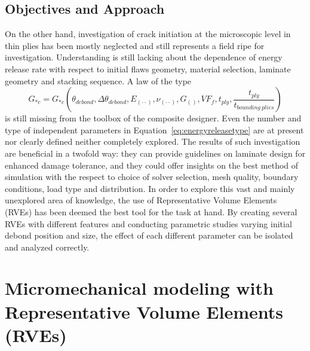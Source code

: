 \documentclass[a4paper]{jpconf}
\begin{document}
\subsection{Objectives and Approach}
On the other hand, investigation of crack initiation at the microscopic level in thin plies has been mostly neglected and still represents a field ripe for investigation. Understanding is still lacking about the dependence of energy release rate with respect to initial flaws geometry, material selection, laminate geometry and stacking sequence. A law of the type
\begin{equation}
\label{eq:energyreleasetype}
G_{*c}=G_{*c}\left(\theta_{debond},\Delta\theta_{debond}, E_{\left(\cdot\cdot\right)}, \nu_{\left(\cdot\cdot\right)}, G_{\left(\right)},VF_{f}, t_{ply}, \frac{t_{ply}}{t_{bounding\ plies}}\right)
\end{equation}
is still missing from the toolbox of the composite designer. Even the number and type of independent parameters in Equation~\ref{eq:energyreleasetype} are at present nor clearly defined neither completely explored. The results of such investigation are beneficial in a twofold way: they can provide guidelines on laminate design for enhanced damage tolerance, and they could offer insights on the best method of simulation with the respect to choice of solver selection, mesh quality, boundary conditions, load type and distribution. In order to explore this vast and mainly unexplored area of knowledge, the use of Representative Volume Elements (RVEs) has been deemed the best tool for the task at hand. By creating several RVEs with different features and conducting parametric studies varying initial debond position and size, the effect of each different parameter can be isolated and analyzed correctly. 


\section{Micromechanical modeling with Representative Volume Elements (RVEs)}
\end{document}
